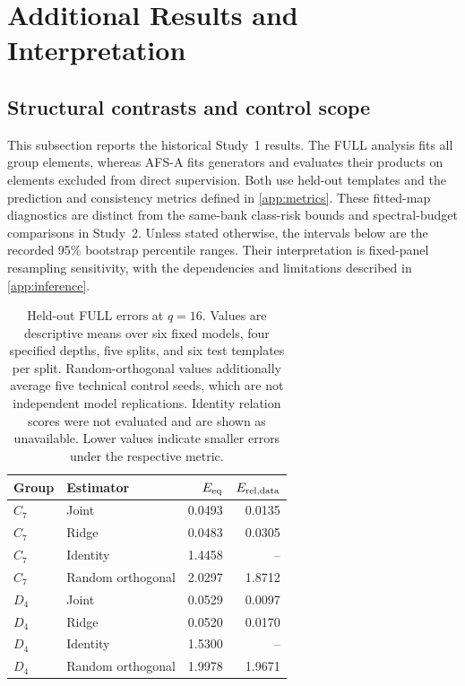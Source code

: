 \section{Additional Results and Interpretation}
\label{app:results}

\subsection{Structural contrasts and control scope}

This subsection reports the historical Study~1 results.
The FULL analysis fits all group elements, whereas AFS-A
fits generators and evaluates their products on elements
excluded from direct supervision.
Both use held-out templates and the prediction and
consistency metrics defined in \cref{app:metrics}.
These fitted-map diagnostics are distinct from the
same-bank class-risk bounds and spectral-budget comparisons
in Study~2.
Unless stated otherwise, the intervals below are the
recorded 95\% bootstrap percentile ranges.
Their interpretation is fixed-panel resampling sensitivity,
with the dependencies and limitations described in
\cref{app:inference}.

\begin{table}[t]
\caption{
Held-out FULL errors at $q=16$.
Values are descriptive means over six fixed models,
four specified depths, five splits, and six test templates
per split.
Random-orthogonal values additionally average five
technical control seeds, which are not independent
model replications.
Identity relation scores were not evaluated and are
shown as unavailable.
Lower values indicate smaller errors under the
respective metric.
}
\label{tab:structural-main}
\centering
\small
\begin{tabular}{llrr}
\toprule
Group & Estimator & $E_{\mathrm{eq}}$ & $E_{\mathrm{rel,data}}$ \\
\midrule
$C_7$ & Joint             & 0.0493 & 0.0135 \\
$C_7$ & Ridge             & 0.0483 & 0.0305 \\
$C_7$ & Identity          & 1.4458 & -- \\
$C_7$ & Random orthogonal & 2.0297 & 1.8712 \\
\midrule
$D_4$ & Joint             & 0.0529 & 0.0097 \\
$D_4$ & Ridge             & 0.0520 & 0.0170 \\
$D_4$ & Identity          & 1.5300 & -- \\
$D_4$ & Random orthogonal & 1.9978 & 1.9671 \\
\bottomrule
\end{tabular}
\end{table}

